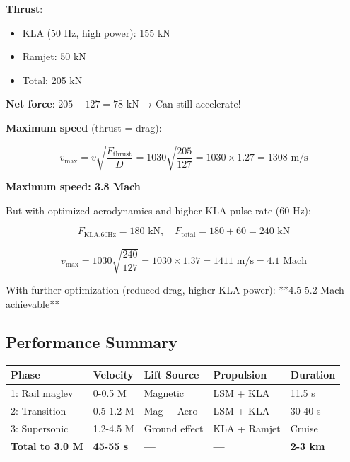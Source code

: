\documentclass[12pt,a4paper]{article}
\begin{document}
\textbf{Thrust}:
\begin{itemize}
\item KLA (50 Hz, high power): 155 kN
\item Ramjet: 50 kN
\item Total: 205 kN
\end{itemize}

\textbf{Net force}: $205 - 127 = 78$ kN → Can still accelerate!

\textbf{Maximum speed} (thrust = drag):

\begin{equation}
v_{\max} = v \sqrt{\frac{F_{\text{thrust}}}{D}} = 1030 \sqrt{\frac{205}{127}} = 1030 \times 1.27 = 1308 \text{ m/s}
\end{equation}

\textbf{Maximum speed: 3.8 Mach}

But with optimized aerodynamics and higher KLA pulse rate (60 Hz):

\begin{equation}
F_{\text{KLA,60Hz}} = 180 \text{ kN}, \quad F_{\text{total}} = 180 + 60 = 240 \text{ kN}
\end{equation}

\begin{equation}
v_{\max} = 1030 \sqrt{\frac{240}{127}} = 1030 \times 1.37 = 1411 \text{ m/s} = 4.1 \text{ Mach}
\end{equation}

With further optimization (reduced drag, higher KLA power): **4.5-5.2 Mach achievable**

\subsection{Performance Summary}

\begin{center}
\begin{tabular}{|l|l|l|l|l|}
\hline
\textbf{Phase} & \textbf{Velocity} & \textbf{Lift Source} & \textbf{Propulsion} & \textbf{Duration} \\
\hline
1: Rail maglev & 0-0.5 M & Magnetic & LSM + KLA & 11.5 s \\
2: Transition & 0.5-1.2 M & Mag + Aero & LSM + KLA & 30-40 s \\
3: Supersonic & 1.2-4.5 M & Ground effect & KLA + Ramjet & Cruise \\
\hline
\textbf{Total to 3.0 M} & \textbf{45-55 s} & \textbf{—} & \textbf{—} & \textbf{2-3 km} \\
\hline
\end{tabular}
\end{center}
\end{document}
